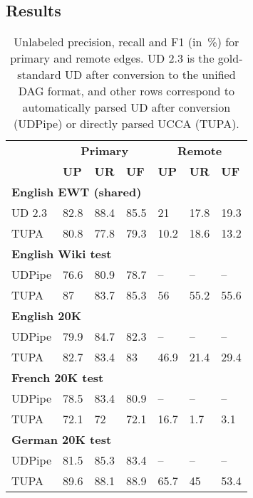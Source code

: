 \documentclass[11pt,a4paper]{article}
\begin{document}
\subsection{Results}\label{sec:results}


\begin{table}[t]
\centering
\begin{tabular}{l|lll|lll}
& \multicolumn{3}{c|}{\footnotesize \bf Primary} & \multicolumn{3}{c}{\footnotesize \bf Remote} \\
& \footnotesize \textbf{UP} & \footnotesize \textbf{UR} & \footnotesize \textbf{UF}
& \footnotesize \textbf{UP} & \footnotesize \textbf{UR} & \footnotesize \textbf{UF} \\
\hline
\multicolumn{4}{l|}{\small \bf English EWT (shared)} & \\
\footnotesize UD 2.3
& 82.8 & 88.4 & 85.5 & 21 & 17.8 & 19.3 \\
\footnotesize TUPA
& 80.8 & 77.8 & 79.3 & 10.2 & 18.6 & 13.2 \\
\multicolumn{4}{l|}{\small \bf English Wiki test} & \\
\footnotesize UDPipe
& 76.6 & 80.9 & 78.7 & -- & -- & -- \\
\footnotesize TUPA
& 87 & 83.7 & 85.3 & 56 & 55.2 & 55.6 \\
\multicolumn{4}{l|}{\small \bf English 20K} & \\
\footnotesize UDPipe
& 79.9 & 84.7 & 82.3 & -- & -- & -- \\
\footnotesize TUPA
& 82.7 & 83.4 & 83 & 46.9 & 21.4 & 29.4 \\
\multicolumn{4}{l|}{\small \bf French 20K test} & \\
\footnotesize UDPipe
& 78.5 & 83.4 & 80.9 & -- & -- & -- \\
\footnotesize TUPA
& 72.1 & 72 & 72.1 & 16.7 & 1.7 & 3.1 \\
\multicolumn{4}{l|}{\small \bf German 20K test} & \\
\footnotesize UDPipe
& 81.5 & 85.3 & 83.4 & -- & -- & -- \\
\footnotesize TUPA
& 89.6 & 88.1 & 88.9 & 65.7 & 45 & 53.4
\end{tabular}
\caption{
Unlabeled precision, recall and F1 (in~\%) for primary and remote edges.
UD 2.3 is the gold-standard UD after conversion to the unified DAG format,
and other rows correspond to automatically parsed UD after conversion (UDPipe)
or directly parsed UCCA (TUPA).
\label{tab:conversion_results_unlabeled}}
\end{table}
\end{document}
